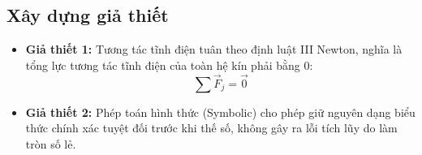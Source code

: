 \subsection{Xây dựng giả thiết}
\begin{itemize}[leftmargin=1.2cm]
    \item \textbf{Giả thiết 1:} Tương tác tĩnh điện tuân theo định luật III Newton, nghĩa là tổng lực tương tác tĩnh điện của toàn hệ kín phải bằng $0$: 
    \[
    \sum \vec{F}_j = \vec{0}
    \]
    \item \textbf{Giả thiết 2:} Phép toán hình thức (Symbolic) cho phép giữ nguyên dạng biểu thức chính xác tuyệt đối trước khi thế số, không gây ra lỗi tích lũy do làm tròn số lẻ.
\end{itemize}
